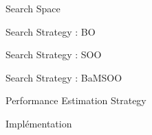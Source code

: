 \begin{frame}{Search Space}
    
\end{frame}

\begin{frame}{Search Strategy : BO}

\end{frame}

\begin{frame}{Search Strategy : SOO}

\end{frame}

\begin{frame}{Search Strategy : BaMSOO}

\end{frame}

\begin{frame}{Performance Estimation Strategy}

\end{frame}

\begin{frame}{Implémentation}

\end{frame}
